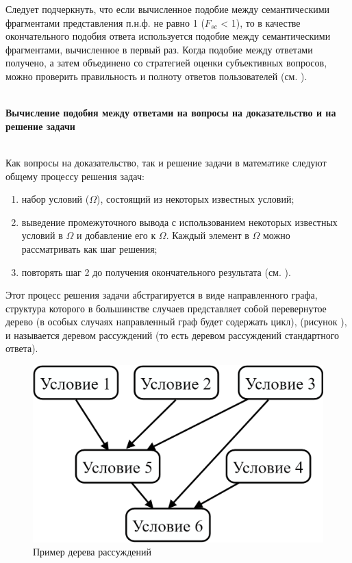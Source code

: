 Следует подчеркнуть, что если вычисленное подобие между семантическими фрагментами представления п.н.ф. не равно 1 ($F_{sc}$ < 1), то в качестве окончательного подобия ответа используется подобие между семантическими фрагментами, вычисленное в первый раз. Когда подобие между ответами получено, а затем объединено со стратегией оценки субъективных вопросов, можно проверить правильность и полноту ответов пользователей (см. ).

~\\
\textbf{Вычисление подобия между ответами на вопросы на доказательство и на решение задачи} 

~\\
Как вопросы на доказательство, так и решение задачи в математике следуют общему процессу решения задач:

\begin{enumerate}
	\item набор условий ($\Omega $), состоящий из некоторых известных условий;
	
	\item выведение промежуточного вывода с использованием некоторых известных условий в $\Omega $ и добавление его к $\Omega $. Каждый элемент в $\Omega $ можно рассматривать как шаг решения;
	
	\item повторять шаг 2 до получения окончательного результата (см. ).
\end{enumerate}

Этот процесс решения задачи абстрагируется в виде направленного графа, структура которого в большинстве случаев представляет собой перевернутое дерево (в особых случаях направленный граф будет содержать цикл), (рисунок \textit{}), и называется деревом рассуждений (то есть деревом рассуждений стандартного ответа).

\begin{figure}[H]
	\includegraphics[scale=0.15]{author/part7/figures/reasoning_tree_example.png}
	\caption{Пример дерева рассуждений}
	\label{fig:RT_example}
\end{figure}

